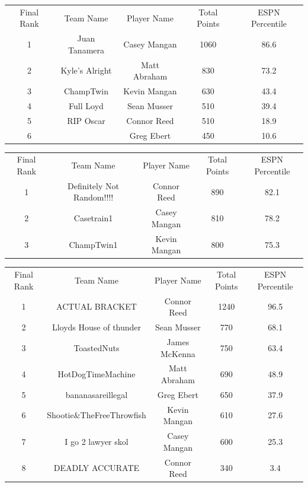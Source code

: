 \documentclass[11pt,letterpaper]{article}
\begin{document}
\vspace{-25pt}
\begin{table} [h]
\begin{center}
\begin{tabular} { c c c c c }
\\ Final Rank & Team Name & Player Name & Total Points & ESPN Percentile
\\ 1  & Juan Tanamera & Casey Mangan & 1060 & 86.6
\\ 2 & Kyle's Alright & Matt Abraham & 830 & 73.2
\\ 3 & ChampTwin & Kevin Mangan & 630 & 43.4
\\ 4 & Full Loyd & Sean Musser & 510 & 39.4
\\ 5 & RIP Oscar & Connor Reed & 510 & 18.9
\\ 6 &  & Greg Ebert & 450 & 10.6
\end{tabular}
\end{center}
\end{table}

\vspace{-25pt}
\begin{table} [h]
\begin{center}
\begin{tabular} { c c c c c }
\\ Final Rank & Team Name & Player Name & Total Points & ESPN Percentile
\\ 1 & Definitely Not Random!!!! & Connor Reed & 890 & 82.1
\\ 2 & Casetrain1 & Casey Mangan & 810 & 78.2
\\ 3 & ChampTwin1 & Kevin Mangan & 800 & 75.3
\end{tabular}
\end{center}
\end{table}

\newpage
{}
\vspace{-25pt}
\begin{table} [h]
\begin{center}
\begin{tabular} { c c c c c }
\\ Final Rank & Team Name & Player Name & Total Points & ESPN Percentile
\\ 1 & ACTUAL BRACKET & Connor Reed & 1240 & 96.5
\\ 2 & Lloyds House of thunder & Sean Musser & 770 & 68.1
\\ 3 & ToastedNuts & James McKenna & 750 & 63.4
\\ 4 & HotDogTimeMachine & Matt Abraham & 690 & 48.9
\\ 5 & bananasareillegal & Greg Ebert & 650 & 37.9
\\ 6 & Shootie\&TheFreeThrowfish & Kevin Mangan & 610 & 27.6
\\ 7 & I go 2 lawyer skol & Casey Mangan & 600 & 25.3
\\ 8 & DEADLY ACCURATE & Connor Reed & 340 & 3.4 
\end{tabular}
\end{center}
\end{table}
\end{document}
